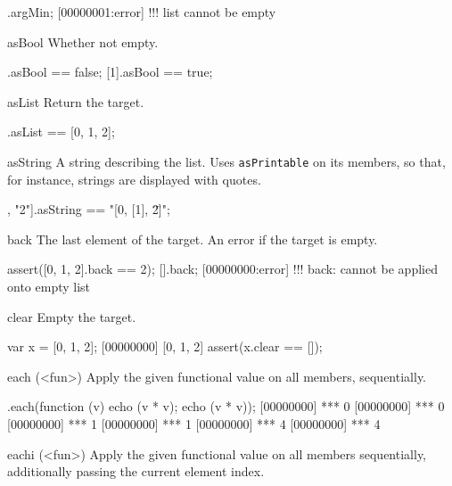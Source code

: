 \begin{urbiscriptapi}
\begin{urbiscript}
[].argMin;
[00000001:error] !!! list cannot be empty
\end{urbiscript}

\item[asBool]
  Whether not empty.
\begin{urbiassert}
[].asBool == false;
[1].asBool == true;
\end{urbiassert}

\item[asList]
Return the target.

\begin{urbiassert}
[0, 1, 2].asList == [0, 1, 2];
\end{urbiassert}

\item[asString]
  A string describing the list.  Uses \lstinline|asPrintable| on its
  members, so that, for instance, strings are displayed with quotes.

\begin{urbiassert}
[0, [1], "2"].asString == "[0, [1], \"2\"]";
\end{urbiassert}

\item[back]
  The last element of the target. An error if the target is empty.

\begin{urbiscript}
assert([0, 1, 2].back == 2);
[].back;
[00000000:error] !!! back: cannot be applied onto empty list
\end{urbiscript}

\item[clear]
  Empty the target.

\begin{urbiscript}
var x = [0, 1, 2];
[00000000] [0, 1, 2]
assert(x.clear == []);
\end{urbiscript}

\item[each](<fun>)
  Apply the given functional value  on all members,
  sequentially.

\begin{urbiscript}
[0, 1, 2].each(function (v) {echo (v * v); echo (v * v)});
[00000000] *** 0
[00000000] *** 0
[00000000] *** 1
[00000000] *** 1
[00000000] *** 4
[00000000] *** 4
\end{urbiscript}

\item[eachi](<fun>)
  Apply the given functional value  on all members
  sequentially, additionally passing the current element index.


\end{urbiscriptapi}
